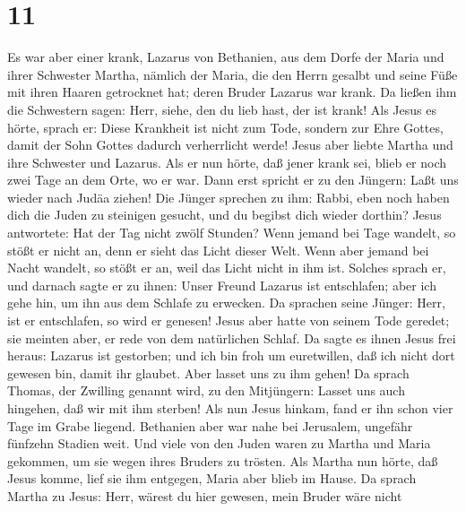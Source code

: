 \hypertarget{section-10}{%
\section{11}\label{section-10}}

 Es war aber einer krank, Lazarus von Bethanien, aus dem
Dorfe der Maria und ihrer Schwester Martha,  nämlich der
Maria, die den Herrn gesalbt und seine Füße mit ihren Haaren getrocknet
hat; deren Bruder Lazarus war krank.  Da ließen ihm die
Schwestern sagen: Herr, siehe, den du lieb hast, der ist krank!
 Als Jesus es hörte, sprach er: Diese Krankheit ist nicht
zum Tode, sondern zur Ehre Gottes, damit der Sohn Gottes dadurch
verherrlicht werde!  Jesus aber liebte Martha und ihre
Schwester und Lazarus.  Als er nun hörte, daß jener krank
sei, blieb er noch zwei Tage an dem Orte, wo er war.  Dann
erst spricht er zu den Jüngern: Laßt uns wieder nach Judäa ziehen!
 Die Jünger sprechen zu ihm: Rabbi, eben noch haben dich
die Juden zu steinigen gesucht, und du begibst dich wieder dorthin?
 Jesus antwortete: Hat der Tag nicht zwölf Stunden? Wenn
jemand bei Tage wandelt, so stößt er nicht an, denn er sieht das Licht
dieser Welt.  Wenn aber jemand bei Nacht wandelt, so
stößt er an, weil das Licht nicht in ihm ist.  Solches
sprach er, und darnach sagte er zu ihnen: Unser Freund Lazarus ist
entschlafen; aber ich gehe hin, um ihn aus dem Schlafe zu erwecken.
 Da sprachen seine Jünger: Herr, ist er entschlafen, so
wird er genesen!  Jesus aber hatte von seinem Tode
geredet; sie meinten aber, er rede von dem natürlichen Schlaf.
 Da sagte es ihnen Jesus frei heraus: Lazarus ist
gestorben;  und ich bin froh um euretwillen, daß ich
nicht dort gewesen bin, damit ihr glaubet. Aber lasset uns zu ihm gehen!
 Da sprach Thomas, der Zwilling genannt wird, zu den
Mitjüngern: Lasset uns auch hingehen, daß wir mit ihm sterben!
 Als nun Jesus hinkam, fand er ihn schon vier Tage im
Grabe liegend.  Bethanien aber war nahe bei Jerusalem,
ungefähr fünfzehn Stadien weit.  Und viele von den Juden
waren zu Martha und Maria gekommen, um sie wegen ihres Bruders zu
trösten.  Als Martha nun hörte, daß Jesus komme, lief sie
ihm entgegen, Maria aber blieb im Hause.  Da sprach
Martha zu Jesus: Herr, wärest du hier gewesen, mein Bruder wäre nicht
